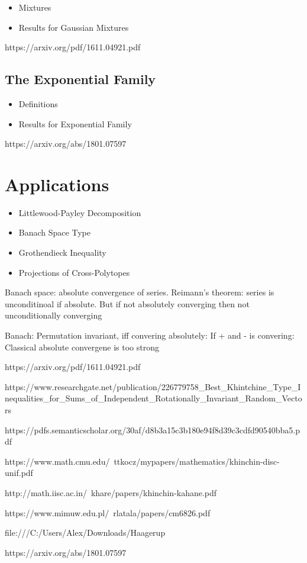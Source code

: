 \documentclass[10pt]{article}
\newcommand{\1}{\textbf{1}}
\theoremstyle{remark}
\theoremstyle{definition}
\begin{document}
\begin{itemize}
	\item Mixtures
	\item Results for Gaussian Mixtures
\end{itemize}

https://arxiv.org/pdf/1611.04921.pdf

\subsection{The Exponential Family}

\begin{itemize}
	\item Definitions
	\item Results for Exponential Family
\end{itemize}

https://arxiv.org/abs/1801.07597

\section{Applications}

\begin{itemize}
	\item Littlewood-Payley Decomposition
	\item Banach Space Type
	\item Grothendieck Inequality
	\item Projections of Cross-Polytopes
\end{itemize}

Banach space: absolute convergence of series. 
	Reimann's theorem: series is unconditinoal if absolute. But if not absolutely converging then not unconditionally converging

Banach: Permutation invariant, iff convering absolutely: If + and - is convering: Classical absolute convergene is too strong



\begin{thebibliography}{9}

https://arxiv.org/pdf/1611.04921.pdf

https://www.researchgate.net/publication/226779758_Best_Khintchine_Type_Inequalities_for_Sums_of_Independent_Rotationally_Invariant_Random_Vectors

https://pdfs.semanticscholar.org/30af/d8b3a15c3b180e94f8d39c3cdfd90540bba5.pdf

https://www.math.cmu.edu/~ttkocz/mypapers/mathematics/khinchin-disc-unif.pdf

http://math.iisc.ac.in/~khare/papers/khinchin-kahane.pdf

https://www.mimuw.edu.pl/~rlatala/papers/cm6826.pdf

file:///C:/Users/Alex/Downloads/Haagerup%

https://arxiv.org/abs/1801.07597

\end{thebibliography}
\end{document}
